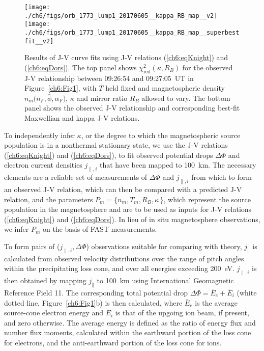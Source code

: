   \begin{figure}
    \centering
    \noindent\texttt{[image: ./ch6/figs/orb\_1773\_lump1\_20170605\_\_kappa\_RB\_map\_\_v2]}
    \noindent\texttt{[image: ./ch6/figs/orb\_1773\_lump1\_20170605\_\_kappa\_RB\_map\_\_superbestfit\_\_v2]}
    \caption[Orbit 1773: Reduced chi-squared values for observed J-V curves with
    $T$ held fixed and magnetospheric density $n_m \big ( n_F, \bar{\phi},
    \alpha_F \big )$ $\kappa$ and $R_B$ allowed to vary, and corresponding
    best-fit J-V curves.]{Results of J-V curve fits using J-V relations
      (\ref{ch6:eqKnight}) and (\ref{ch6:eqDors}). The top panel shows
      $\chi^2_{\mathrm{red}} ( \kappa, R_B)$ for the
      observed J-V relationship between 09:26:54 and 09:27:05~UT in
      Figure~\ref{ch6:Fig1}, with $T$ held fixed and magnetospheric density $n_m
      \big ( n_F, \bar{\phi}, \alpha_F \big )$, $\kappa$ and mirror ratio $R_B$
      allowed to vary. The bottom panel shows the observed J-V relationship and
      corresponding best-fit Maxwellian and kappa J-V relations.}
    \label{ch6:Fig3}
  \end{figure}


  To independently infer $\kappa$, or the degree to which the magnetospheric
  source population is in a nonthermal stationary state, we use the J-V
  relations (\ref{ch6:eqKnight}) and (\ref{ch6:eqDors}), to fit observed
  potential drops $\Delta \Phi$ and electron current densities $j_{\parallel,i}$
  that have been mapped to 100~km. The necessary elements are a reliable set of
  measurements of $\Delta \Phi$ and $j_{\parallel,i}$ from which to form an
  observed J-V relation, which can then be compared with a predicted J-V
  relation, and the parameters $P_m = \{ n_m, T_m, R_B, \kappa \, \}$, which
  represent the source population in the magnetosphere and are to be used as
  inputs for J-V relations (\ref{ch6:eqKnight}) and (\ref{ch6:eqDors}). In lieu
  of in situ magnetosphere observations, we infer $P_m$ on the basis of FAST
  measurements.

  To form pairs of ($j_{\parallel,i}, \Delta \Phi$) observations suitable for
  comparing with theory, $j_\parallel$ is calculated from observed velocity
  distributions over the range of pitch angles within the precipitating loss
  cone, and over all energies exceeding 200~eV.  $j_{\parallel,i}$ is then
  obtained by mapping $j_\parallel$ to 100~km using International Geomagnetic
  Reference Field 11. The corresponding total potential drop $\Delta \Phi =
  \bar{E}_e + \bar{E}_i$ (white dotted line, Figure~\ref{ch6:Fig1}b) is then
  calculated, where $\bar{E}_e$ is the average source-cone electron energy and
  $\bar{E}_i$ is that of the upgoing ion beam, if present, and zero
  otherwise. The average energy is defined as the ratio of energy flux and
  number flux moments, calculated within the earthward portion of the loss cone
  for electrons, and the anti-earthward portion of the loss cone for ions.

